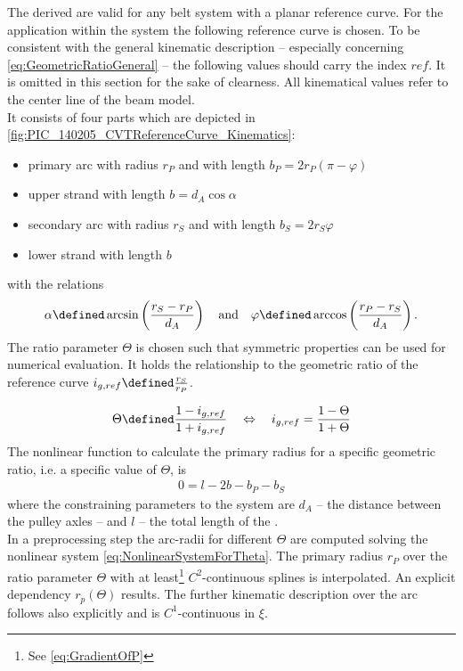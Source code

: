 The derived \EOMs are valid for any belt system with a planar reference curve.
For the application within the \CVT system the following reference curve is chosen.
To be consistent with the general kinematic description -- especially concerning \eqref{eq:GeometricRatioGeneral} -- the following values should carry the index $ref$.
It is omitted in this section for the sake of clearness.
All kinematical values refer to the center line of the beam model.\\ 
\newpage
It consists of four parts which are depicted in \cref{fig:PIC_140205_CVTReferenceCurve_Kinematics}:
%
\begin{itemize}
  \item primary arc with radius $r_P$ and with length $b_P = 2 r_P (\pi - \varphi)$
  \item upper strand with length $b = d_A \cos\alpha$
  \item secondary arc with radius $r_S$ and with length $b_S = 2 r_S \varphi$
  \item lower strand with length $b$
\end{itemize}
%
with the relations
%
\begin{align*}
  \alpha \defined \arcsin\left( \frac{r_S - r_P}{d_A} \right)
  \quad \text{and} \quad
  \varphi \defined \arccos\left(\frac{r_P - r_S}{d_A}\right).
\end{align*}
%
The ratio parameter $\Theta$ is chosen such that symmetric properties can be used for numerical evaluation.
It holds the relationship to the geometric ratio of the reference curve $i_{g,ref} \defined \frac{r_S}{r_P}$.

\begin{align}
  \Theta \defined \frac{1-i_{g,ref}}{1+i_{g,ref}} \quad \Leftrightarrow \quad i_{g,ref} = \frac{1-\Theta}{1+\Theta}
\end{align}
%
The nonlinear function to calculate the primary radius for a specific geometric ratio, i.e. a specific value of $\Theta$, is
%
\begin{align}
  \label{eq:NonlinearSystemForTheta}
  0 = l - 2 b - b_P - b_S
\end{align}
%
where the constraining parameters to the system are $d_A$ -- the distance between the pulley axles -- and $l$ -- the total length of the \ring.\\
In a preprocessing step the arc-radii for different $\Theta$ are computed solving the nonlinear system \eqref{eq:NonlinearSystemForTheta}.
The primary radius $r_P$ over the ratio parameter $\Theta$ with at least\footnote{See \eqref{eq:GradientOfP}} $C^2$-continuous splines is interpolated.
An explicit dependency $r_p(\Theta)$ results.
The further kinematic description over the arc follows also explicitly and is $C^1$-continuous in $\xi$.\par

